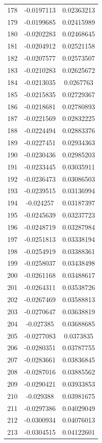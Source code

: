 \documentclass[a4paper, 11pt, oneside]{report}
\begin{document}
{\begin{longtable}{|c|c|c|}
178 & -0.0197113 & 0.02363213 \\
179 & -0.0199685 & 0.02415989 \\
180 & -0.0202283 & 0.02468645 \\
181 & -0.0204912 & 0.02521158 \\
182 & -0.0207577 & 0.02573507 \\
183 & -0.0210283 & 0.02625672 \\
184 & -0.0213035 & 0.0267763  \\
185 & -0.0215835 & 0.02729367 \\
186 & -0.0218681 & 0.02780893 \\
187 & -0.0221569 & 0.02832225 \\
188 & -0.0224494 & 0.02883376 \\
189 & -0.0227451 & 0.02934363 \\
190 & -0.0230436 & 0.02985203 \\
191 & -0.0233445 & 0.03035911 \\
192 & -0.0236473 & 0.03086503 \\
193 & -0.0239515 & 0.03136994 \\
194 & -0.024257  & 0.03187397 \\
195 & -0.0245639 & 0.03237723 \\
196 & -0.0248719 & 0.03287984 \\
197 & -0.0251813 & 0.03338194 \\
198 & -0.0254919 & 0.03388361 \\
199 & -0.0258037 & 0.03438498 \\
200 & -0.0261168 & 0.03488617 \\
201 & -0.0264311 & 0.03538726 \\
202 & -0.0267469 & 0.03588813 \\
203 & -0.0270647 & 0.03638819 \\
204 & -0.027385  & 0.03688685 \\
205 & -0.0277083 & 0.0373835  \\
206 & -0.0280351 & 0.03787755 \\
207 & -0.0283661 & 0.03836845 \\
208 & -0.0287016 & 0.03885562 \\
209 & -0.0290421 & 0.03933853 \\
210 & -0.029388  & 0.03981675 \\
211 & -0.0297386 & 0.04029049 \\
212 & -0.0300934 & 0.04076013 \\
213 & -0.0304515 & 0.04122601 \\

\end{longtable}}
\end{document}
